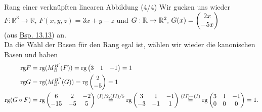\begin{Beispiel}
{Rang einer verknüpften linearen Abbildung (4/4)}
Wir gucken uns wieder\\
$F:\mathbb{R}^3\to\mathbb{R},\,F(x,y,z)=3x+y-z$ und $G:\mathbb{R}\to \mathbb{R}^2,\,G(x)=\begin{pmatrix}2x\\-5x\end{pmatrix}$\\
(aus \hyperref[beisp:12VerknupfungLinAbb]{Bsp. 13.13}) an.\\
Da die Wahl der Basen für den Rang egal ist, wählen wir wieder die kanonischen Basen und haben
\begin{align*}
    \text{rg} F&=\text{rg} (M_B^{B'}(F))=\text{rg}\begin{pmatrix}3&1&-1\end{pmatrix}=1\\
    \text{rg} G &=\text{rg} (M_{B'}^{B''}(G))=\text{rg} \begin{pmatrix}2\\-5\end{pmatrix}=1\\
    \text{rg} (G\circ F)&=\text{rg} \begin{pmatrix}6&2&-2\\-15&-5 &5\end{pmatrix}\overset{(I)/2, (II)/5}{=}\text{rg} \begin{pmatrix}3&1&-1\\-3&-1&1\end{pmatrix}\overset{(II)-(I)}{=}\text{rg}\begin{pmatrix}3&1&-1\\0&0&0\end{pmatrix}=1.
\end{align*}
\end{Beispiel}
